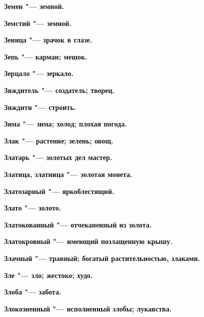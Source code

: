 \begin{mymulticols}{2}
\bfseries Земен\normalfont{} "--- земной. 




\bfseries Земстий\normalfont{} "--- земной. 




\bfseries Зеница\normalfont{} "--- зрачок в глазе. 




\bfseries Зепь\normalfont{} "--- карман; мешок. 




\bfseries Зерцало\normalfont{} "--- зеркало. 




\bfseries Зиждитель\normalfont{} "--- создатель; творец. 




\bfseries Зиждити\normalfont{} "--- строить. 




\bfseries Зима\normalfont{} "--- зима; холод; плохая погода. 




\bfseries Злак\normalfont{} "--- растение; зелень; овощ. 




\bfseries Златарь\normalfont{} "--- золотых дел мастер. 




\bfseries Златица, златница\normalfont{} "--- золотая монета. 




\bfseries Златозарный\normalfont{} "--- яркоблестящий. 




\bfseries Злато\normalfont{} "--- золото. 




\bfseries Златокованный\normalfont{} "--- отчеканенный из золота. 




\bfseries Златокровный\normalfont{} "--- имеющий позлащенную крышу. 




\bfseries Злачный\normalfont{} "--- травный; богатый растительностью, злаками. 




\bfseries Зле\normalfont{} "--- зло; жестоко; худо. 




\bfseries Злоба\normalfont{} "--- забота. 




\bfseries Злокозненный\normalfont{} "--- исполненный злобы; лукавства. 





\end{mymulticols}
